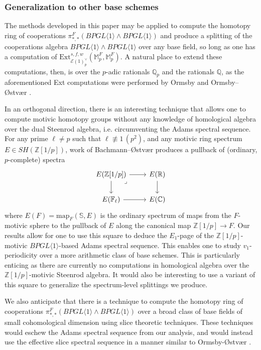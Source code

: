\documentclass{amsart}
\theoremstyle{plain}
\numberwithin{theorem}{section}
\numberwithin{equation}{section}
\numberwithin{figure}{section}
\newcommand{\0}{\langle 0 \rangle }
\begin{document}
\subsubsection{Generalization to other base schemes}
The methods developed in this paper may be applied to compute the homotopy ring of cooperations $\pi_{*,*}^F(BPGL\langle 1 \rangle \wedge BPGL \langle 1 \rangle)$ and produce a splitting of the cooperations algebra $BPGL \langle 1 \rangle \wedge BPGL \langle 1 \rangle$ over any base field, so long as one has a computation of $\text{Ext}_{\mathcal{E}(1)^\vee_p}^{s,f,w}(\mathbb{M}_p^F, \mathbb{M}_p^F)$. A natural place to extend these computations, then, is over the $p$-adic rationals $\mathbb{Q}_p$ and the rationals $\mathbb{Q}$, as the aforementioned Ext computations were performed by Ormsby \cite{Ormsby11} and Ormsby--\O stv\ae r \cite{OrmOst13}. 
 
In an orthogonal direction, there is an interesting technique that allows one to compute motivic homotopy groups without any knowledge of homological algebra over the dual Steenrod algebra, i.e. circumventing the Adams spectral sequence. For any prime $\ell \neq p$ such that $\ell \not\equiv 1\, (p^2)$, and any motivic ring spectrum $E \in SH(\mathbb{Z}[1/p])$, work of Bachmann--\O stv\ae r \cite{BO22} produces a pullback of (ordinary, $p$-complete) spectra 
\[\begin{tikzcd}
	{E(\mathbb{Z}[1/p])} & {E(\mathbb{R})} \\
	{E(\mathbb{F}_\ell)} & {E(\mathbb{C})}
	\arrow[from=1-1, to=1-2]
	\arrow[from=1-1, to=2-1]
	\arrow["\lrcorner"{anchor=center, pos=0.125}, draw=none, from=1-1, to=2-2]
	\arrow[from=1-2, to=2-2]
	\arrow[from=2-1, to=2-2]
\end{tikzcd}\]
where $E(F) = \text{map}_{F}(\mathbb{S}, E)$ is the ordinary spectrum of maps from the $F$-motivic sphere to the pullback of $E$ along the canonical map $\mathbb{Z}[1/p] \to F$. Our results allow for one to use this square to  deduce the $E_1$-page of the $\mathbb{Z}[1/p]$-motivic $BPGL\langle 1 \rangle$-based Adams spectral sequence. This enables one to study $v_1$-periodicity over a more arithmetic class of base schemes. This is particularly enticing as there are currently no computations in homological algebra over the $\mathbb{Z}[1/p]$-motivic Steenrod algebra. It would also be interesting to use a variant of this square to generalize the spectrum-level splittings we produce.

We also anticipate that there is a technique to compute the homotopy ring of cooperations $\pi_{*,*}^F(BPGL\langle 1 \rangle \wedge BPGL \langle 1 \rangle )$ over a broad class of base fields of small cohomological dimension using slice theoretic techniques. These techniques would eschew the Adams spectral sequence from our analysis, and would instead use the effective slice spectral sequence in a manner similar to Ormsby-\O stv\ae r \cite{OrmOst14}.
\end{document}
